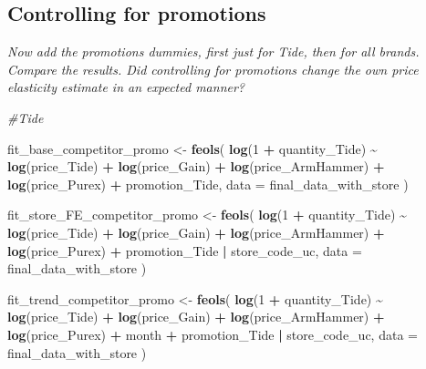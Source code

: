 \documentclass[
]{article}
\newenvironment{Shaded}{\begin{snugshade}}{\end{snugshade}}
\newcommand{\AttributeTok}[1]{\textcolor[rgb]{0.13,0.29,0.53}{#1}}
\newcommand{\CommentTok}[1]{\textcolor[rgb]{0.56,0.35,0.01}{\textit{#1}}}
\newcommand{\DecValTok}[1]{\textcolor[rgb]{0.00,0.00,0.81}{#1}}
\newcommand{\FunctionTok}[1]{\textcolor[rgb]{0.13,0.29,0.53}{\textbf{#1}}}
\newcommand{\NormalTok}[1]{#1}
\newcommand{\OtherTok}[1]{\textcolor[rgb]{0.56,0.35,0.01}{#1}}
\newcommand{\SpecialCharTok}[1]{\textcolor[rgb]{0.81,0.36,0.00}{\textbf{#1}}}
\begin{document}
\subsection{Controlling for
promotions}\label{controlling-for-promotions}

\emph{Now add the promotions dummies, first just for Tide, then for all
brands. Compare the results. Did controlling for promotions change the
own price elasticity estimate in an expected manner?}

\begin{Shaded}
\begin{Highlighting}[]
\CommentTok{\#Tide}

\NormalTok{fit\_base\_competitor\_promo }\OtherTok{\textless{}{-}} \FunctionTok{feols}\NormalTok{(}
  \FunctionTok{log}\NormalTok{(}\DecValTok{1} \SpecialCharTok{+}\NormalTok{ quantity\_Tide) }\SpecialCharTok{\textasciitilde{}} \FunctionTok{log}\NormalTok{(price\_Tide) }\SpecialCharTok{+} \FunctionTok{log}\NormalTok{(price\_Gain) }\SpecialCharTok{+}
    \FunctionTok{log}\NormalTok{(price\_ArmHammer) }\SpecialCharTok{+} \FunctionTok{log}\NormalTok{(price\_Purex) }\SpecialCharTok{+}\NormalTok{ promotion\_Tide,}
  \AttributeTok{data =}\NormalTok{ final\_data\_with\_store}
\NormalTok{)}

\NormalTok{fit\_store\_FE\_competitor\_promo }\OtherTok{\textless{}{-}} \FunctionTok{feols}\NormalTok{(}
  \FunctionTok{log}\NormalTok{(}\DecValTok{1} \SpecialCharTok{+}\NormalTok{ quantity\_Tide) }\SpecialCharTok{\textasciitilde{}} \FunctionTok{log}\NormalTok{(price\_Tide) }\SpecialCharTok{+} \FunctionTok{log}\NormalTok{(price\_Gain) }\SpecialCharTok{+}
    \FunctionTok{log}\NormalTok{(price\_ArmHammer) }\SpecialCharTok{+} \FunctionTok{log}\NormalTok{(price\_Purex) }\SpecialCharTok{+}\NormalTok{ promotion\_Tide }\SpecialCharTok{|}\NormalTok{ store\_code\_uc,}
  \AttributeTok{data =}\NormalTok{ final\_data\_with\_store}
\NormalTok{)}

\NormalTok{fit\_trend\_competitor\_promo }\OtherTok{\textless{}{-}} \FunctionTok{feols}\NormalTok{(}
  \FunctionTok{log}\NormalTok{(}\DecValTok{1} \SpecialCharTok{+}\NormalTok{ quantity\_Tide) }\SpecialCharTok{\textasciitilde{}} \FunctionTok{log}\NormalTok{(price\_Tide) }\SpecialCharTok{+} \FunctionTok{log}\NormalTok{(price\_Gain) }\SpecialCharTok{+} 
    \FunctionTok{log}\NormalTok{(price\_ArmHammer) }\SpecialCharTok{+} \FunctionTok{log}\NormalTok{(price\_Purex) }\SpecialCharTok{+}\NormalTok{ month }\SpecialCharTok{+} 
\NormalTok{    promotion\_Tide }\SpecialCharTok{|}\NormalTok{ store\_code\_uc,}
  \AttributeTok{data =}\NormalTok{ final\_data\_with\_store}
\NormalTok{)}


\end{Highlighting}
\end{Shaded}
\end{document}
